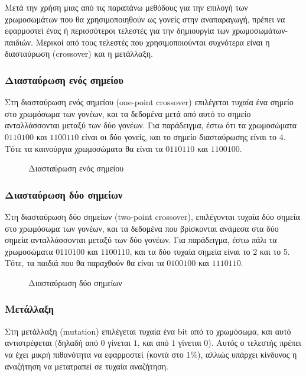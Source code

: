 Μετά την χρήση μιας από τις παραπάνω μεθόδους για την επιλογή των χρωμοσωμάτων που θα χρησιμοποιηθούν ως γονείς στην αναπαραγωγή, πρέπει να εφαρμοστεί ένας ή περισσότεροι τελεστές για την δημιουργία των χρωμοσωμάτων-παιδιών. Μερικοί από τους τελεστές που χρησιμοποιούνται συχνότερα είναι η διασταύρωση (crossover) και η μετάλλαξη.

\subsubsection{Διασταύρωση ενός σημείου}

Στη διασταύρωση ενός σημείου (one-point crossover) επιλέγεται τυχαία ένα σημείο στο χρωμόσωμα των γονέων, και τα δεδομένα μετά από αυτό το σημείο ανταλλάσσονται μεταξύ των δύο γονέων. Για παράδειγμα, έστω ότι τα χρωμοσώματα $0110100$ και $1100110$ είναι οι δύο γονείς, και το σημείο διασταύρωσης είναι το $4$. Τότε τα καινούργια χρωμοσώματα θα είναι τα $0110110$ και $1100100$.

\begin{figure}[!t]
    \centering
    \def\svgwidth{2.5in}
    
    \caption{Διασταύρωση ενός σημείου \cite{opc_fig}}
    \label{fig_opc}
\end{figure}

\subsubsection{Διασταύρωση δύο σημείων}

Στη διασταύρωση δύο σημείων (two-point crossover), επιλέγονται τυχαία δύο σημεία στο χρωμόσωμα των γονέων, και τα δεδομένα που βρίσκονται ανάμεσα στα δύο σημεία ανταλλάσσονται μεταξύ των δύο γονέων. Για παράδειγμα, έστω πάλι τα χρωμοσώματα $0110100$ και $1100110$, και τα δύο τυχαία σημεία είναι το 2 και το 5. Τότε, τα παιδιά που θα παραχθούν θα είναι τα $0100100$ και $1110110$.

\begin{figure}[!t]
    \centering
    \def\svgwidth{2.5in}
    
    \caption{Διασταύρωση δύο σημείων \cite{tpc_fig}}
    \label{fig_tpc}
\end{figure}

\subsubsection{Μετάλλαξη}

Στη μετάλλαξη (mutation) επιλέγεται τυχαία ένα bit από το χρωμόσωμα, και αυτό αντιστρέφεται (δηλαδή από $0$ γίνεται $1$, και από $1$ γίνεται $0$). Αυτός ο τελεστής πρέπει να έχει μικρή πιθανότητα να εφαρμοστεί (κοντά στο $1\%$), αλλιώς υπάρχει κίνδυνος η αναζήτηση να μετατραπεί σε τυχαία αναζήτηση. \cite{zotero-PNQJ3TKI}

